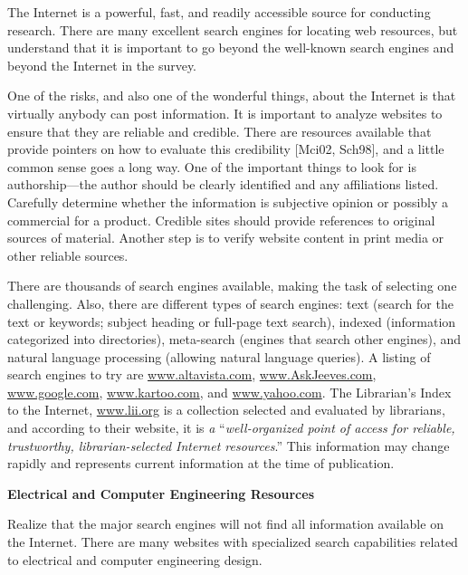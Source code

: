 The Internet is a powerful, fast, and readily accessible source for
conducting research. There are many excellent search engines for
locating web resources, but understand that it is important to go beyond
the well-known search engines and beyond the Internet in the survey.

One of the risks, and also one of the wonderful things, about the
Internet is that virtually anybody can post information. It is important
to analyze websites to ensure that they are reliable and credible. There
are resources available that provide pointers on how to evaluate this
credibility {[}Mci02, Sch98{]}, and a little common sense goes a long
way. One of the important things to look for is authorship---the author
should be clearly identified and any affiliations listed. Carefully
determine whether the information is subjective opinion or possibly a
commercial for a product. Credible sites should provide references to
original sources of material. Another step is to verify website content
in print media or other reliable sources.

There are thousands of search engines available, making the task of
selecting one challenging. Also, there are different types of search
engines: text (search for the text or keywords; subject heading or
full-page text search), indexed (information categorized into
directories), meta-search (engines that search other engines), and
natural language processing (allowing natural language queries). A
listing of search engines to try are
\href{http://www.altavista.com}{www.altavista.com},
\href{http://www.AskJeeves.com}{www.AskJeeves.com},
\href{http://www.google.com}{www.google.com},
\href{http://www.kartoo.com}{www.kartoo.com}, and
\href{http://www.yahoo.com}{www.yahoo.com}. The Librarian's Index to the
Internet, \href{http://www.lii.org}{www.lii.org} is a collection
selected and evaluated by librarians, and according to their website, it
is \emph{a} ``\emph{well-organized point of access for reliable,
trustworthy, librarian-selected Internet resources}.'' This information
may change rapidly and represents current information at the time of
publication.

\textbf{Electrical and Computer Engineering Resources}

Realize that the major search engines will not find all information
available on the Internet. There are many websites with specialized
search capabilities related to electrical and computer engineering
design.

